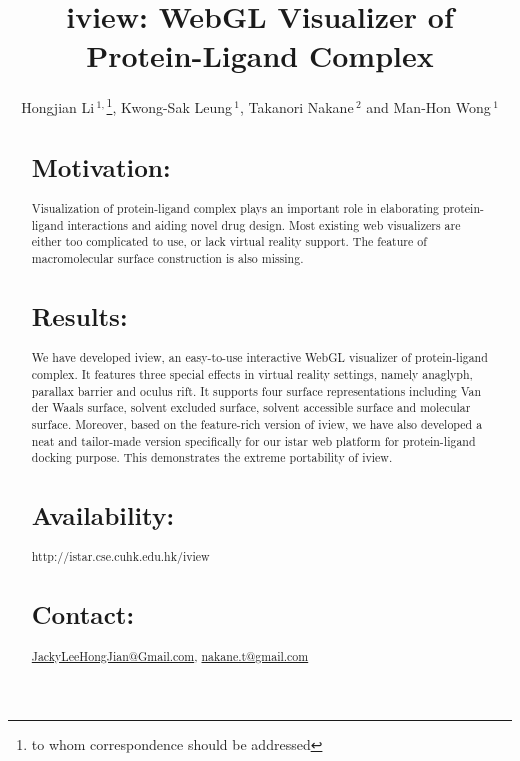 \documentclass{bioinfo}
\begin{document}

\title[iview]{iview: WebGL Visualizer of Protein-Ligand Complex}
\author[Hongjian Li \textit{et~al}]{Hongjian Li\,$^{1,}$\footnote{to whom correspondence should be addressed}, Kwong-Sak Leung\,$^{1}$, Takanori Nakane\,$^{2}$ and Man-Hon Wong\,$^{1}$}
\address{$^{1}$Department of Computer Science and Engineering, Chinese University of Hong Kong, Hong Kong\\
$^{2}$Graduate School of Medicine, Kyoto University, Japan}



\maketitle

\begin{abstract}

\section{Motivation:}
Visualization of protein-ligand complex plays an important role in elaborating protein-ligand interactions and aiding novel drug design. Most existing web visualizers are either too complicated to use, or lack virtual reality support. The feature of macromolecular surface construction is also missing.

\section{Results:}
We have developed iview, an easy-to-use interactive WebGL visualizer of protein-ligand complex. It features three special effects in virtual reality settings, namely anaglyph, parallax barrier and oculus rift. It supports four surface representations including Van der Waals surface, solvent excluded surface, solvent accessible surface and molecular surface. Moreover, based on the feature-rich version of iview, we have also developed a neat and tailor-made version specifically for our istar web platform for protein-ligand docking purpose. This demonstrates the extreme portability of iview.

\section{Availability:}
http://istar.cse.cuhk.edu.hk/iview

\section{Contact:} \href{JackyLeeHongJian@Gmail.com}{JackyLeeHongJian@Gmail.com}, \href{nakane.t@gmail.com}{nakane.t@gmail.com}
\end{abstract}
\end{document}
